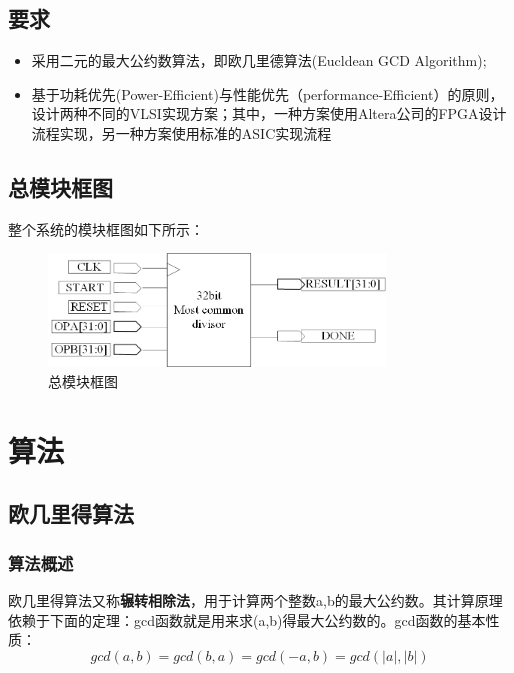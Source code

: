 \documentclass[12pt]{article}
\begin{document}
\subsection{要求}
\begin{itemize}
\item 采用二元的最大公约数算法，即欧几里德算法(Eucldean GCD Algorithm);
\item 基于功耗优先(Power-Efficient)与性能优先（performance-Efficient）的原则，设计两种不同的VLSI实现方案；其中，一种方案使用Altera公司的FPGA设计流程实现，另一种方案使用标准的ASIC实现流程
\end{itemize}


\subsection{总模块框图}
整个系统的模块框图如下所示：
\begin{figure}[H]
\begin{center}
\includegraphics[width=0.8\textwidth]{./workflow/32bit_most_common_divisor.jpg}
\caption{总模块框图}
\end{center}
\end{figure}
\section{算法}

\subsection{欧几里得算法}
\subsubsection{算法概述}
欧几里得算法又称\textbf{辗转相除法}，用于计算两个整数a,b的最大公约数。其计算原理依赖于下面的定理：gcd函数就是用来求(a,b)得最大公约数的。gcd函数的基本性质：
\begin{equation}
gcd(a,b) = gcd(b,a) = gcd(-a,b) = gcd(|a|,|b|) \label{oringal_gcd}
\end{equation}
\end{document}
